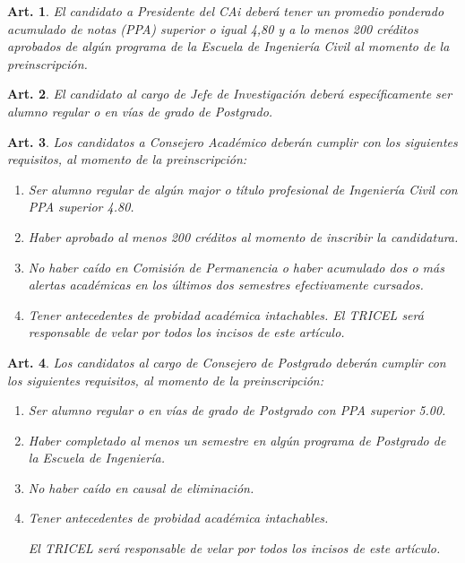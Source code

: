 \documentclass[letterpaper,11pt]{article}
\theoremstyle{plain}
\newtheorem{art}{Art.} %
\begin{document}
		\begin{art}\label{requisitosPresidente}
			El candidato a Presidente del CAi deberá tener un promedio ponderado acumulado de notas (PPA) superior o igual 4,80 y a lo menos 200 créditos aprobados de algún programa de la Escuela de Ingeniería Civil al momento de la preinscripción.
		\end{art}

		\begin{art}\label{requisitosJefeInvestigacion}
			El candidato al cargo de Jefe de Investigación deberá específicamente ser alumno regular o en vías de grado de Postgrado.
		\end{art}

		\begin{art}\label{requisitosCAPregrado}
			Los candidatos a Consejero Académico deberán cumplir con los siguientes requisitos, al momento de la preinscripción:
			\begin{enumerate}
				\item Ser alumno regular de algún major o título profesional de Ingeniería Civil con PPA superior 4.80.
		
				\item Haber aprobado al menos 200 créditos al momento de inscribir la candidatura.
		
				\item No haber caído en Comisión de Permanencia o haber acumulado dos o más alertas académicas en los últimos dos semestres efectivamente cursados.
		
				\item Tener antecedentes de probidad académica intachables. 
				El TRICEL será responsable de velar por todos los incisos de este artículo.
			\end{enumerate}
		\end{art}

		\begin{art}\label{requisitosCAPostegrado}
			Los candidatos al cargo de Consejero de Postgrado deberán cumplir con los siguientes requisitos, al momento de la preinscripción:
			\begin{enumerate}
				\item Ser alumno regular o en vías de grado de Postgrado con PPA superior 5.00.

				\item Haber completado al menos un semestre en algún programa de Postgrado de la Escuela de Ingeniería.

				\item No haber caído en causal de eliminación.

				\item Tener antecedentes de probidad académica intachables. 

				El TRICEL será responsable de velar por todos los incisos de este artículo.
			\end{enumerate}
		\end{art}
\end{document}
